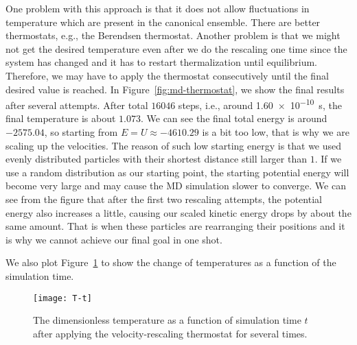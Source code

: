 One problem with this approach is that it does not
allow fluctuations in temperature which are present in the canonical ensemble.
There are better thermostats, e.g., the Berendsen thermostat.
Another problem is that we might not get the desired temperature even after we do the
rescaling one time since the system has changed and it has to restart thermalization
until equilibrium. Therefore, we may have to apply the thermostat consecutively
until the final desired value is reached.
In Figure~\ref{fig:md-thermostat}, we show the final results after several attempts.
After total \(16046\) steps, i.e., around \qty{1.60e-10}{\second}, the final temperature is
about \(1.073\).
We can see the final total energy is around \(-2575.04\), so starting from
\(E = U \approx -4610.29\) is a bit too low, that is why we are scaling up the velocities.
The reason of such low starting energy is that we used evenly distributed particles
with their shortest distance still larger than \(1\). If we use a random distribution
as our starting point, the starting potential energy will become very large and
may cause the MD simulation slower to converge.
We can see from the figure that after the first two rescaling attempts, the potential
energy also increases a little, causing our scaled kinetic energy drops by about the
same amount. That is when these particles are rearranging their positions and
it is why we cannot achieve our final goal in one shot.

We also plot Figure~\ref{fig:T-t} to show the change of temperatures as a function
of the simulation time.

\begin{figure}
    \centering
    \texttt{[image: T-t]}
    \caption{The dimensionless temperature as a function of simulation time \(t\) after
        applying the velocity-rescaling thermostat for several times.}
    \label{fig:T-t}
\end{figure}
